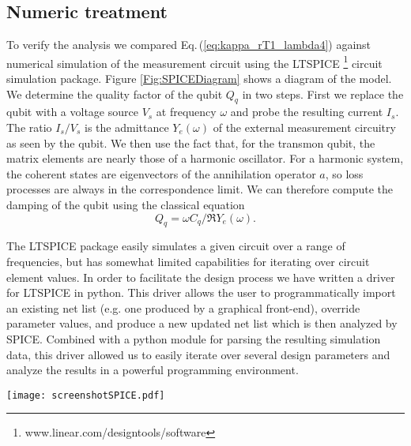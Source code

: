 \subsection{Numeric treatment}

To verify the analysis we compared Eq.\,(\ref{eq:kappa_rT1_lambda4}) against numerical simulation of the measurement circuit using the LTSPICE \footnote{www.linear.com/designtools/software} circuit simulation package.
Figure \ref{Fig:SPICEDiagram} shows a diagram of the model.
We determine the quality factor of the qubit $Q_q$ in two steps.
First we replace the qubit with a voltage source $V_s$ at frequency $\omega$ and probe the resulting current $I_s$.
The ratio $I_s / V_s$ is the admittance $Y_e(\omega)$ of the external measurement circuitry as seen by the qubit.
We then use the fact that, for the transmon qubit, the matrix elements are nearly those of a harmonic oscillator.
For a harmonic system, the coherent states are eigenvectors of the annihilation operator $a$, so loss processes are always in the correspondence limit.
We can therefore compute the damping of the qubit using the classical equation \cite{Esteve:dissipation1986}  \begin{equation}
Q_q = \omega C_q / \Re{Y_e(\omega)}. \label{eq:Q_qAdmittance} \end{equation}

The LTSPICE package easily simulates a given circuit over a range of frequencies, but has somewhat limited capabilities for iterating over circuit element values.
In order to facilitate the design process we have written a driver for LTSPICE in python.
This driver allows the user to programmatically import an existing net list (e.g. one produced by a graphical front-end), override parameter values, and produce a new updated net list which is then analyzed by SPICE.
Combined with a python module for parsing the resulting simulation data, this driver allowed us to easily iterate over several design parameters and analyze the results in a powerful programming environment.

\begin{figure*}
\begin{centering}
\texttt{[image: screenshotSPICE.pdf]}
\par\end{centering}
\caption{Screen capture of the SPICE model. The qubit is replaced by a voltage source which is activated with an ac signal of amplitude $V_s$ at variable frequency $\omega$. The current $I_s$ through the source is probed and the admittance of the external circuit computed as $Y_e(\omega)=I_s / V_s$. Note that the filter $\lambda/4$ transmission line resonator is not drawn to scale; the end which connects to ground is physically shorter than the other section.}
\label{Fig:SPICEDiagram}
\end{figure*}

